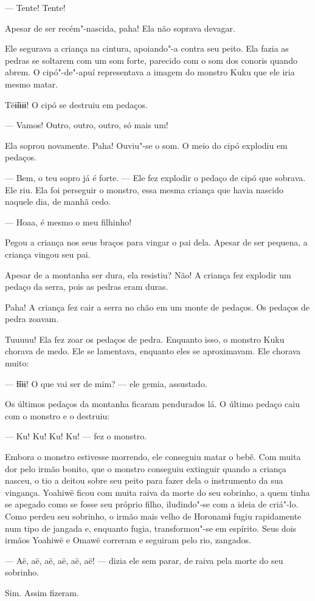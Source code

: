 --- Tente! Tente! 

Apesar de ser recém"-nascida, paha! Ela não soprava devagar. 
   
Ele segurava a criança na cintura, apoiando"-a contra seu peito. Ela fazia as pedras se soltarem com um som forte, parecido com o som dos
conoris quando abrem. O cipó"-de"-apuí representava a imagem do monstro
Kuku que ele iria mesmo matar. 

Tëɨ̃ɨɨɨɨ! O cipó se destruiu em pedaços. 

--- Vamos! Outro, outro, outro, só mais um!

Ela soprou novamente. Paha! Ouviu"-se o som. O meio do cipó explodiu em pedaços. 

--- Bem, o teu sopro já é forte. --- Ele fez explodir o pedaço de cipó
que sobrava. Ele riu. Ela foi perseguir o monstro, essa mesma criança
que havia nascido naquele dia, de manhã cedo. 

--- Hoaa, é mesmo o meu filhinho! 

Pegou a criança nos seus braços para vingar o pai dela. Apesar de ser
pequena, a criança vingou seu pai. 

Apesar de a montanha ser dura, ela resistiu? Não! A criança fez explodir um
pedaço da serra, pois as pedras eram duras. 

Paha! A criança fez cair a serra no chão em um monte de pedaços. Os
pedaços de pedra zoavam.

Tuuuuu! Ela fez zoar os pedaços de pedra. Enquanto isso, o monstro Kuku
chorava de medo. Ele se lamentava, enquanto eles se aproximavam. Ele
chorava muito:

--- Ɨ̃ɨɨɨ! O que vai ser de mim? --- ele gemia, assustado. 

Os últimos pedaços da montanha ficaram pendurados lá. O último pedaço
caiu com o monstro e o destruiu: 

--- Ku! Ku! Ku! Ku! --- fez o monstro. 

Embora o monstro estivesse morrendo, ele conseguiu matar o bebê. Com
muita dor pelo irmão bonito, que o monstro conseguiu extinguir quando a
criança nasceu, o tio a deitou sobre seu peito para fazer dela o
instrumento da sua vingança. Yoahiwë ficou com muita raiva da morte do
seu sobrinho, a quem tinha se apegado como se fosse seu próprio filho,
iludindo"-se com a ideia de criá"-lo. Como perdeu seu sobrinho, o irmão
mais velho de Horonamɨ fugiu rapidamente num tipo de jangada e, enquanto
fugia, transformou"-se em espírito. Seus dois irmãos Yoahiwë e Omawë correram e seguiram pelo rio, zangados. 

--- Aë, aë, aë, aë, aë, aë! --- dizia ele sem parar, de raiva pela morte
do seu sobrinho. 

Sim. Assim fizeram.

 
